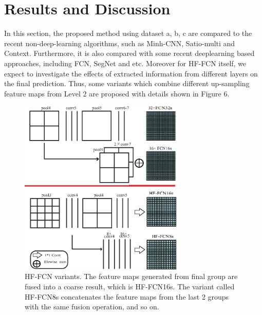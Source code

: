 \section{Results and Discussion}
\label{Sec:Res}
In this section, the proposed method using dataset a, b, c are compared to the recent non-deep-learning algorithms, such as Minh-CNN\cite{IEEEexample:mnih2013machine}, Satio-multi\cite{IEEEexample:saito2016multiple} and Context\cite{IEEEexample:audebert2017deep}. Furthermore, it is also compared with some recent deeplearning based approaches, including FCN\cite{IEEEexample:Long_2015_CVPR}, SegNet\cite{IEEEexample:badrinarayanan2017segnet} and etc. Moreover for HF-FCN itself, we expect to investigate the effects of extracted information from different layers on the final prediction. Thus, some variants which combine different up-sampling feature maps from Level 2 are proposed with details shown in Figure 6.\par

\begin{figure}[t]
\begin{center}
\includegraphics[width=7.8cm]{Figures/vairants.eps}
\caption{HF-FCN variants. The feature maps generated from final group are fused into a coarse result, which is HF-FCN16s. The variant called HF-FCN8s concatenates the feature maps from the last 2 groups with the same fusion operation, and so on.}
\label{6}
\end{center}
\end{figure}

